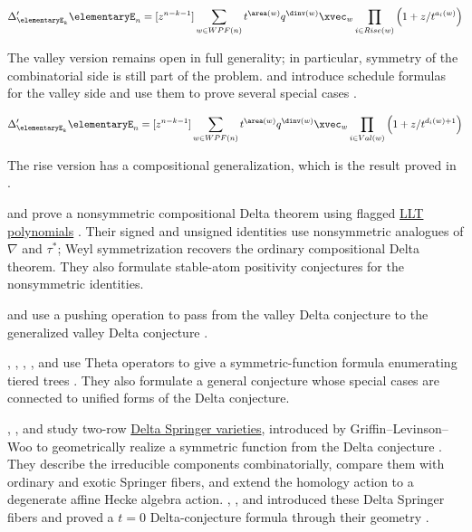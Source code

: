 \begin{theorem}
\[
\Delta'_{\elementaryE_k} \elementaryE_n
= [z^{n-k-1}]
\sum_{w \in WPF(n)}
  t^{\area(w)}q^{\dinv(w)} \xvec_w
\prod_{i \in Rise(w)} \left(1 + z/t^{a_i(w)}\right)
\]
\end{theorem}

The valley version remains open in full generality; in particular, symmetry of
the combinatorial side is still part of the problem.
 and  introduce schedule formulas for
the valley side and use them to prove several special cases
\cite{HaglundSergel2020}.
\begin{conjecture}
\[
\Delta'_{\elementaryE_k} \elementaryE_n =
[z^{n-k-1}]
\sum_{w \in WPF(n)} t^{\area(w)}q^{\dinv(w)} \xvec_w
\prod_{i \in Val(w)} \left(1 + z/t^{d_i(w)+1}\right)
\]
\end{conjecture}

The rise version has a compositional generalization, which is the result proved
in \cite{DAdderioMellit2022}.

 and  prove a nonsymmetric compositional
Delta theorem using flagged \hyperref[LLT]{LLT polynomials}
\cite{QiuZhang2026xNonsymmetricDelta}.  Their signed and unsigned identities
use nonsymmetric analogues of $\nabla$ and $\tau^*$; Weyl symmetrization
recovers the ordinary compositional Delta theorem.  They also formulate
stable-atom positivity conjectures for the nonsymmetric identities.

 and  use a pushing
operation to pass from the valley Delta conjecture to the generalized valley
Delta conjecture \cite{IraciWyngaerd2022}.

, , ,
, and  use Theta operators to
give a symmetric-function formula enumerating tiered trees
\cite{DAdderioIraciLeBorgneRomeroVandenWyngaerd2023}.  They also formulate a
general conjecture whose special cases are connected to unified forms of the
Delta conjecture.

, , and  study
two-row \hyperref[springerFibers]{Delta Springer varieties}, introduced by Griffin--Levinson--Woo to
geometrically realize a symmetric function from the Delta conjecture
\cite{LacabanneVazWilbert2025}.  They describe the irreducible components
combinatorially, compare them with ordinary and exotic Springer fibers, and
extend the homology action to a degenerate affine Hecke algebra action.
, , and 
introduced these Delta Springer fibers and proved a $t=0$ Delta-conjecture
formula through their geometry \cite{GriffinLevinsonWoo2024}.

